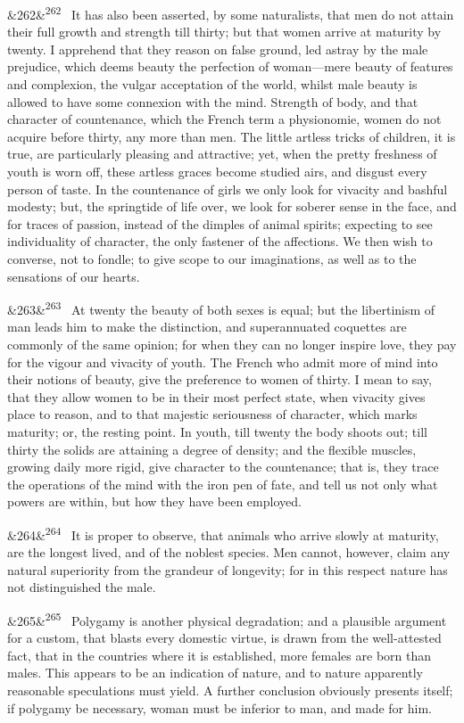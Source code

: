 \documentclass[12pt]{article}
\newcommand{\para}[1][]{\par\noindent\ifx&#1&\else\textsuperscript{\footnotesize #1}~\fi}
\begin{document}
\para[262] It has also been asserted, by some naturalists, that men do not attain their full growth and strength till thirty; but that women arrive at maturity by twenty. I apprehend that they reason on false ground, led astray by the male prejudice, which deems beauty the perfection of woman---mere beauty of features and complexion, the vulgar acceptation of the world, whilst male beauty is allowed to have some connexion with the mind. Strength of body, and that character of countenance, which the French term a physionomie, women do not acquire before thirty, any more than men. The little artless tricks of children, it is true, are particularly pleasing and attractive; yet, when the pretty freshness of youth is worn off, these artless graces become studied airs, and disgust every person of taste. In the countenance of girls we only look for vivacity and bashful modesty; but, the springtide of life over, we look for soberer sense in the face, and for traces of passion, instead of the dimples of animal spirits; expecting to see individuality of character, the only fastener of the affections. We then wish to converse, not to fondle; to give scope to our imaginations, as well as to the sensations of our hearts.

\para[263] At twenty the beauty of both sexes is equal; but the libertinism of man leads him to make the distinction, and superannuated coquettes are commonly of the same opinion; for when they can no longer inspire love, they pay for the vigour and vivacity of youth. The French who admit more of mind into their notions of beauty, give the preference to women of thirty. I mean to say, that they allow women to be in their most perfect state, when vivacity gives place to reason, and to that majestic seriousness of character, which marks maturity; or, the resting point. In youth, till twenty the body shoots out; till thirty the solids are attaining a degree of density; and the flexible muscles, growing daily more rigid, give character to the countenance; that is, they trace the operations of the mind with the iron pen of fate, and tell us not only what powers are within, but how they have been employed.

\para[264] It is proper to observe, that animals who arrive slowly at maturity, are the longest lived, and of the noblest species. Men cannot, however, claim any natural superiority from the grandeur of longevity; for in this respect nature has not distinguished the male.

\para[265] Polygamy is another physical degradation; and a plausible argument for a custom, that blasts every domestic virtue, is drawn from the well-attested fact, that in the countries where it is established, more females are born than males. This appears to be an indication of nature, and to nature apparently reasonable speculations must yield. A further conclusion obviously presents itself; if polygamy be necessary, woman must be inferior to man, and made for him.
\end{document}

